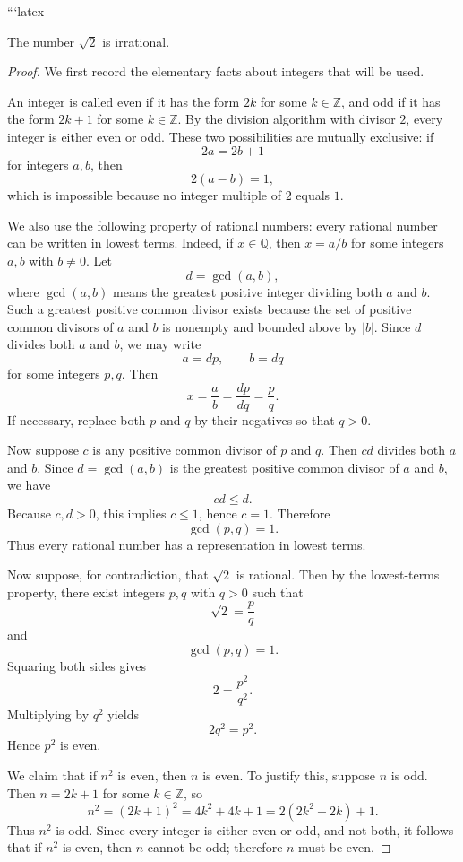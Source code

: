 ```latex
\begin{theorem}
The number $\sqrt{2}$ is irrational.
\end{theorem}

\begin{proof}
We first record the elementary facts about integers that will be used.

An integer is called even if it has the form $2k$ for some $k \in \mathbb Z$, and odd if it has the form $2k+1$ for some $k \in \mathbb Z$. By the division algorithm with divisor $2$, every integer is either even or odd. These two possibilities are mutually exclusive: if
\[
2a = 2b+1
\]
for integers $a,b$, then
\[
2(a-b)=1,
\]
which is impossible because no integer multiple of $2$ equals $1$.

We also use the following property of rational numbers: every rational number can be written in lowest terms. Indeed, if $x \in \mathbb Q$, then $x=a/b$ for some integers $a,b$ with $b \neq 0$. Let
\[
d=\gcd(a,b),
\]
where $\gcd(a,b)$ means the greatest positive integer dividing both $a$ and $b$. Such a greatest positive common divisor exists because the set of positive common divisors of $a$ and $b$ is nonempty and bounded above by $|b|$. Since $d$ divides both $a$ and $b$, we may write
\[
a=dp,\qquad b=dq
\]
for some integers $p,q$. Then
\[
x=\frac{a}{b}=\frac{dp}{dq}=\frac{p}{q}.
\]
If necessary, replace both $p$ and $q$ by their negatives so that $q>0$.

Now suppose $c$ is any positive common divisor of $p$ and $q$. Then $cd$ divides both $a$ and $b$. Since $d=\gcd(a,b)$ is the greatest positive common divisor of $a$ and $b$, we have
\[
cd \leq d.
\]
Because $c,d>0$, this implies $c\leq 1$, hence $c=1$. Therefore
\[
\gcd(p,q)=1.
\]
Thus every rational number has a representation in lowest terms.

Now suppose, for contradiction, that $\sqrt{2}$ is rational. Then by the lowest-terms property, there exist integers $p,q$ with $q>0$ such that
\[
\sqrt{2}=\frac{p}{q}
\]
and
\[
\gcd(p,q)=1.
\]
Squaring both sides gives
\[
2=\frac{p^2}{q^2}.
\]
Multiplying by $q^2$ yields
\[
2q^2=p^2.
\]
Hence $p^2$ is even.

We claim that if $n^2$ is even, then $n$ is even. To justify this, suppose $n$ is odd. Then $n=2k+1$ for some $k\in\mathbb Z$, so
\[
n^2=(2k+1)^2=4k^2+4k+1
=2(2k^2+2k)+1.
\]
Thus $n^2$ is odd. Since every integer is either even or odd, and not both, it follows that if $n^2$ is even, then $n$ cannot be odd; therefore $n$ must be even.


\end{proof}
